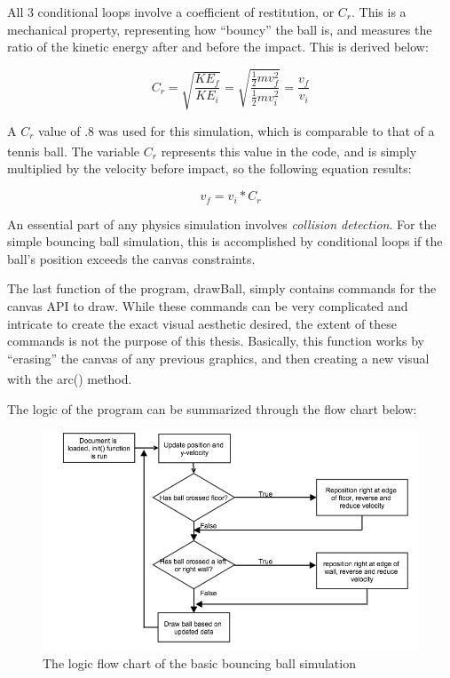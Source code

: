 All 3 conditional loops involve a coefficient of restitution, or $C_r$.  This is a mechanical property, representing how ``bouncy'' the ball is, and measures the ratio of the kinetic energy after and before the impact.  This is derived below:

\begin{equation}\label{eq:cr}
C_r = \sqrt{\frac{KE_f}{KE_i}} = \sqrt{\frac{\frac{1}{2} mv_f^2}{\frac{1}{2} mv_i^2}} = \frac{v_f}{v_i}
\end{equation}

A $C_r$ value of .8 was used for this simulation, which is comparable to that of a tennis ball\textsuperscript{\cite{tennisball}}.  The variable $C_r$ represents this value in the code, and is simply multiplied by the velocity before impact, so the following equation results:

\begin{equation}\label{eq:velocitycr}
v_f = v_i * C_r
\end{equation}

An essential part of any physics simulation involves \textit{collision detection}.  For the simple bouncing ball simulation, this is accomplished by conditional loops if the ball's position exceeds the canvas constraints.  


The last function of the program, drawBall, simply contains commands for the canvas API to draw.  While these commands can be very complicated and intricate to create the exact visual aesthetic desired, the extent of these commands is not the purpose of this thesis.  Basically, this function works by ``erasing'' the canvas of any previous graphics, and then creating a new visual with the arc() method.\textsuperscript{\cite{basichtml5}}   

The logic of the program can be summarized through the flow chart below:


\begin{figure}[h] 
	\centering
		\includegraphics[width=15cm]{Figures/basicbouncingball.png}

	\caption{The logic flow chart of the basic bouncing ball simulation}
	\label{fig:basicbouncingball}
\end{figure}





